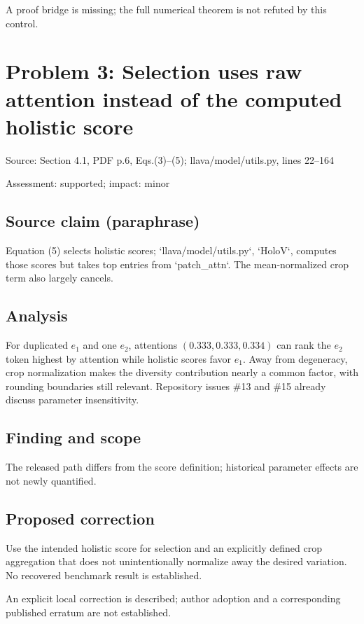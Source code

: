 \documentclass[11pt]{article}
\begin{document}
A proof bridge is missing; the full numerical theorem is not refuted by this control.

\section*{Problem 3: Selection uses raw attention instead of the computed holistic score}

Source: Section 4.1, PDF p.6, Eqs.(3)–(5); llava/model/utils.py, lines 22–164

Assessment: supported; impact: minor

\subsection*{Source claim (paraphrase)}

Equation (5) selects holistic scores; `llava/model/utils.py`, `HoloV`, computes those scores but takes top entries from `patch\_attn`. The mean-normalized crop term also largely cancels.

\subsection*{Analysis}

For duplicated \(e_1\) and one \(e_2\), attentions \((0.333,0.333,0.334)\) can rank the \(e_2\) token highest by attention while holistic scores favor \(e_1\). Away from degeneracy, crop normalization makes the diversity contribution nearly a common factor, with rounding boundaries still relevant. Repository issues \#13 and \#15 already discuss parameter insensitivity.

\subsection*{Finding and scope}

The released path differs from the score definition; historical parameter effects are not newly quantified.

\subsection*{Proposed correction}

Use the intended holistic score for selection and an explicitly defined crop aggregation that does not unintentionally normalize away the desired variation. No recovered benchmark result is established.

An explicit local correction is described; author adoption and a corresponding published erratum are not established.
\end{document}
